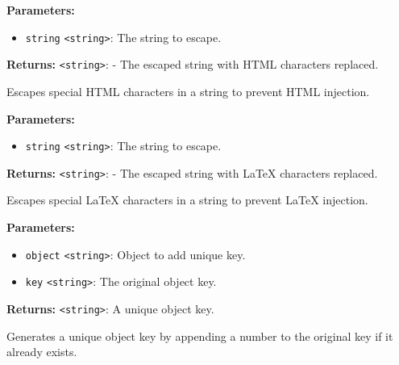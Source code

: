 \documentclass[12pt,a4paper]{article}
\begin{document}
\vspace{5mm}
\noindent {}


\noindent \textbf{Parameters:}
\begin{itemize}
  \item \texttt{string} \texttt{<string>}: The string to escape.
\end{itemize}

\noindent \textbf{Returns:} \texttt{<string>}: - The escaped string with HTML characters replaced.

\noindent Escapes special HTML characters in a string to prevent HTML injection.

\vspace{5mm}
\noindent {}


\noindent \textbf{Parameters:}
\begin{itemize}
  \item \texttt{string} \texttt{<string>}: The string to escape.
\end{itemize}

\noindent \textbf{Returns:} \texttt{<string>}: - The escaped string with LaTeX characters replaced.

\noindent Escapes special LaTeX characters in a string to prevent LaTeX injection.

\vspace{5mm}
\noindent {}


\noindent \textbf{Parameters:}
\begin{itemize}
  \item \texttt{object} \texttt{<string>}: Object to add unique key.
  \item \texttt{key} \texttt{<string>}: The original object key.
\end{itemize}

\noindent \textbf{Returns:} \texttt{<string>}: A unique object key.

\noindent Generates a unique object key by appending a number to the original key if it already exists.

\vspace{5mm}
\noindent {}
\end{document}
